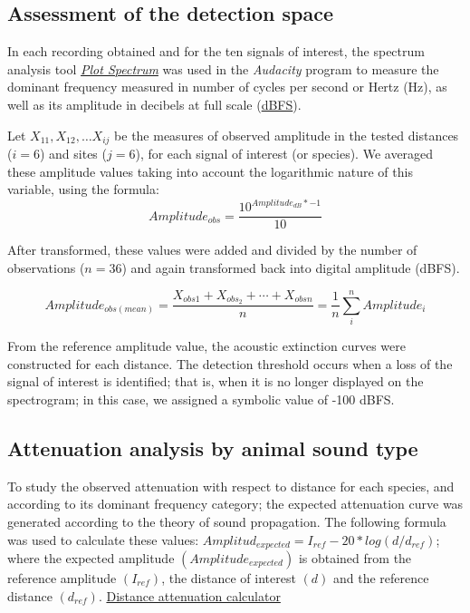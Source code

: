 \documentclass[fleqn,10pt,lineno]{wlpeerj} %
\begin{document}
\hypertarget{assessment-of-the-detection-space}{%
\subsection*{Assessment of the detection space}\label{assessment-of-the-detection-space}}

In each recording obtained and for the ten signals of interest, the spectrum analysis tool \href{file:///C:/Program\%20Files\%20(x86)/Audacity/help/manual/man/plot_spectrum.html}{\emph{Plot Spectrum}} was used in the \emph{Audacity} program to measure the dominant frequency measured in number of cycles per second or Hertz (Hz), as well as its amplitude in decibels at full scale (\href{https://en.wikipedia.org/wiki/DBFS}{dBFS}).

Let \(X_{11}, X_{12},\ldots X_{ij}\) be the measures of observed amplitude in the tested distances (\(i = 6\)) and sites (\(j = 6\)), for each signal of interest (or species). We averaged these amplitude values taking into account the logarithmic nature of this variable, using the formula: \[Amplitude_{obs} = \frac{10^{Amplitude_{dB}*{-1}}}{10}\]

After transformed, these values were added and divided by the number of observations (\(n = 36\)) and again transformed back into digital amplitude (dBFS).

\[Amplitude_{obs(mean)} = \frac{X_{obs1} + X_{obs_2} + \cdots + X_{obsn}} {n}
      = \frac{1}{n}\sum_{i}^{n} Amplitude_{i} \]

From the reference amplitude value, the acoustic extinction curves were constructed for each distance. The detection threshold occurs when a loss of the signal of interest is identified; that is, when it is no longer displayed on the spectrogram; in this case, we assigned a symbolic value of -100 dBFS.

\hypertarget{attenuation-analysis-by-animal-sound-type}{%
\subsection*{Attenuation analysis by animal sound type}\label{attenuation-analysis-by-animal-sound-type}}

To study the observed attenuation with respect to distance for each species, and according to its dominant frequency category; the expected attenuation curve was generated according to the theory of sound propagation. The following formula was used to calculate these values: \(Amplitud_{expected} = I_{ref}-20*log(d/d_{ref})\); where the expected amplitude \((Amplitude_{expected})\) is obtained from the reference amplitude \((I_{ref})\), the distance of interest \((d)\) and the reference distance \((d_{ref})\). \href{https://www.omnicalculator.com/physics/distance-attenuation\#inverse-square-law}{Distance attenuation calculator}
\end{document}
